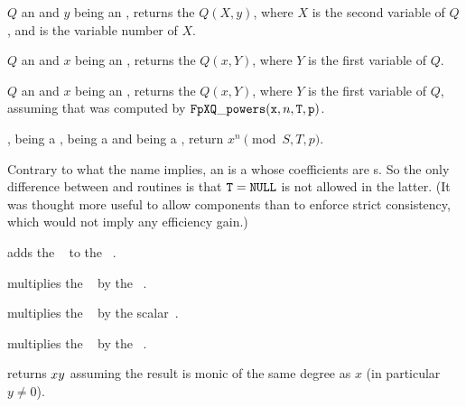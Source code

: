  $Q$ an 
and $y$ being an , returns the  $Q(X,y)$, where $X$ is the
second variable of $Q$, and  is the variable number of $X$.

 $Q$ an  and
$x$ being an , returns the  $Q(x,Y)$, where $Y$ is the
first variable of $Q$.

 $Q$ an  and
$x$ being an , returns the  $Q(x,Y)$, where $Y$ is the
first variable of $Q$, assuming that  was computed by
${\tt FpXQ\_powers}({\tt x}, n, {\tt T}, {\tt p})$.

,  being a
,  being a  and  being a ,
return $x^n \pmod{S,T,p}$.

Contrary to what the name implies, an  is a  whose
coefficients are s. So the only difference between  and
 routines is that ${\tt T} = {\tt NULL}$ is not allowed in the
latter. (It was thought more useful to allow  components than to
enforce strict consistency, which would not imply any efficiency gain.)



 adds the
~ to the ~.




 multiplies the
~ by the ~.

 multiplies the
~ by the scalar~.

 multiplies the
~ by the ~.

returns $x\*y$ assuming the result is monic of the same degree as $x$ (in
particular $y\neq 0$).

